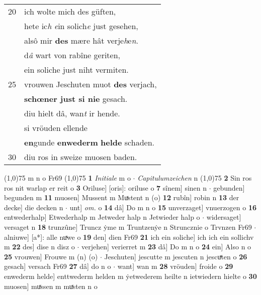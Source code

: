 \documentclass[8pt,a4paper,notitlepage]{article}
\begin{document}
\begin{table}[ht]
\begin{minipage}[t]{0.5\linewidth}
\begin{tabular}{rl}
20 & ich wolte mich des güften,\\ 
 & hete ic\textit{h} \textit{e}in solich\textit{e} just gesehen,\\ 
 & alsô mir \textbf{des} mære hât verje\textit{h}e\textit{n}.\\ 
 & d\textit{â} wart von rabîne geriten,\\ 
 & ein soliche just niht vermiten.\\ 
25 & vrouwen Jeschuten muot \textbf{des} verjach,\\ 
 & \textbf{schœner just si nie} gesach.\\ 
 & diu hielt dâ, wan\textit{t} ir hende.\\ 
 & si vröuden ellende\\ 
 & \textbf{en}gunde \textbf{enwederm} \textbf{helde} schaden.\\ 
30 & diu ros in sweize muosen baden.\\ 
\end{tabular}
\scriptsize
\line(1,0){75} \newline
m n o Fr69 \newline
\line(1,0){75} \newline
\textbf{1} \textit{Initiale} m o   $\cdot$ \textit{Capitulumzeichen} n  \newline
\line(1,0){75} \newline
\textbf{2} Sin ros ros nit warlap er reit o \textbf{3} Oriluse] [oris]: oriluse o \textbf{7} sînem] sinen n  $\cdot$ gebunden] begunden m \textbf{11} muosen] Mussent m Muͯstent n (o) \textbf{12} rubîn] robin n \textbf{13} der decke] die decken n  $\cdot$ unt] \textit{om.} o \textbf{14} dâ] Do m n o \textbf{15} unverzaget] vnuerzogen o \textbf{16} entwederhalp] Etwederhalp m Jetweder halp n Jetwieder halp o  $\cdot$ widersaget] versaget n \textbf{18} trunzûne] Truncz ẏme m Truntzenẏe n Struncznie o Trvnzen Fr69  $\cdot$ alniuwe] [a*]: alle nuͯwe o \textbf{19} den] dien Fr69 \textbf{21} ich ein soliche] ich ich ein sollichv m \textbf{22} des] dise n disz o  $\cdot$ verjehen] verierret m \textbf{23} dâ] Do m n o \textbf{24} ein] Also n o \textbf{25} vrouwen] Frouwe m (n) (o)  $\cdot$ Jeschuten] jescutte m jescuten n jescuͯten o \textbf{26} gesach] versach Fr69 \textbf{27} dâ] do n o  $\cdot$ want] wan m \textbf{28} vröuden] froide o \textbf{29} enwederm helde] enttwederm helden m ẏetwederem heilte n ietwiedern hielte o \textbf{30} muosen] muͯssen m muͯsten n o \newline
\end{minipage}
\end{table}
\end{document}
